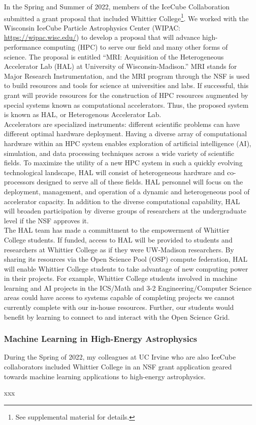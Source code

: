 \documentclass[../../../main.tex]{subfiles}
\begin{document}
In the Spring and Summer of 2022, members of the IceCube Collaboration submitted a grant proposal that included Whittier College\footnote{See supplemental material for details.}.  We worked with the Wisconsin IceCube Particle Astrophysics Center (WIPAC: \url{https://wipac.wisc.edu/}) to develop a proposal that will advance high-performance computing (HPC) to serve our field and many other forms of science.  The proposal is entitled ``MRI: Acquisition of the Heterogeneous Accelerator Lab (HAL) at University of Wisconsin-Madison.''  MRI stands for Major Research Instrumentation, and the MRI program through the NSF is used to build resources and tools for science at universities and labs.  If successful, this grant will provide resources for the construction of HPC resources augmented by special systems known as computational accelerators.  Thus, the proposed system is known as HAL, or Heterogenous Accelerator Lab.
\\
\vspace{0.25cm}
Accelerators are specialized instruments: different scientific problems can have different optimal hardware deployment.  Having a diverse array of computational hardware within an HPC system enables exploration of artificial intelligence (AI), simulation, and data processing techniques across a wide variety of scientific fields.  To maximize the utility of a new HPC system in such a quickly evolving technological landscape, HAL will consist of heterogeneous hardware and co-processors designed to serve all of these fields. HAL personnel will focus on the deployment, management, and operation of a dynamic and heterogeneous pool of accelerator capacity.  In addition to the diverse computational capability, HAL will broaden participation by diverse groups of researchers at the undergraduate level if the NSF approves it.
\\
\vspace{0.25cm}
The HAL team has made a committment to the empowerment of Whittier College students.  If funded, access to HAL will be provided to students and researchers at Whittier College as if they were UW-Madison researchers.  By sharing its resources via the
Open Science Pool (OSP) compute federation, HAL will enable Whittier College students to take advantage of new computing power in their projects.  For example, Whittier College students involved in machine learning and AI projects in the ICS/Math and 3-2 Engineering/Computer Science areas could have access to systems capable of completing projects we cannot currently complete with our in-house resources.  Further, our students would benefit by learning to connect to and interact with the Open Science Grid.

\subsubsection{Machine Learning in High-Energy Astrophysics}

During the Spring of 2022, my colleagues at UC Irvine who are also IceCube collaborators included Whittier College in an NSF grant application geared towards machine learning applications to high-energy astrophysics.

xxx
\end{document}
